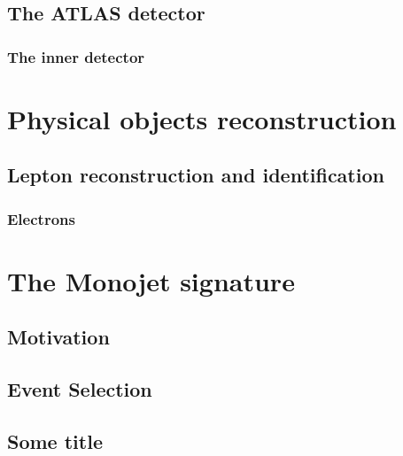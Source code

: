 \documentclass[10pt,twoside,cucitura,classica,english,openany]{toptesi}
\begin{document}
\section{The ATLAS detector}
\label{sec:atlas-detector}

\subsection{The inner detector}
\label{sec:inner-detector}



\chapter{Physical objects reconstruction}
\label{cha:phys-objects-reconst}

\section{Lepton reconstruction and identification}
\label{sec:lept-reconstr-ident}



\subsection{Electrons}
\label{sec:electrons}



\chapter{The Monojet signature}
\label{cha:monojet-signature}

\section{Motivation}
\label{sec:motivation}



\section{Event Selection}
\label{sec:event-selection}



\begin{appendices}
  \chapter{Some title}
\end{appendices}

 \printbibliography
\end{document}
